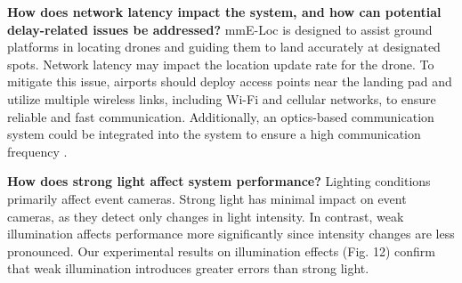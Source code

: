 {\noindent \textbf{How does network latency impact the system, and how can potential delay-related issues be addressed?}
mmE-Loc is designed to assist ground platforms in locating drones and guiding them to land accurately at designated spots.
Network latency may impact the location update rate for the drone. 
To mitigate this issue, airports should deploy access points near the landing pad and utilize multiple wireless links, including Wi-Fi and cellular networks, to ensure reliable and fast communication.
Additionally, an optics-based communication system could be integrated into the system to ensure a high communication frequency \cite{wang2024towards}.

\noindent \textbf{How does strong light affect system performance?}
Lighting conditions primarily affect event cameras.
Strong light has minimal impact on event cameras, as they detect only changes in light intensity. 
In contrast, weak illumination affects performance more significantly since intensity changes are less pronounced.
Our experimental results on illumination effects (Fig. 12) confirm that weak illumination introduces greater errors than strong light.

}
